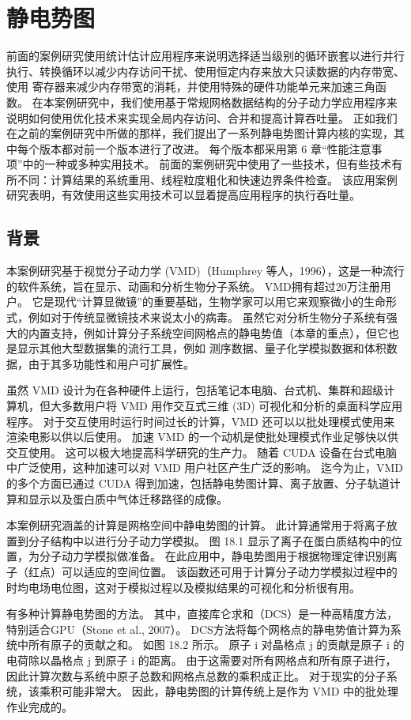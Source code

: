 \section{静电势图}
前面的案例研究使用统计估计应用程序来说明选择适当级别的循环嵌套以进行并行执行、转换循环以减少内存访问干扰、使用恒定内存来放大只读数据的内存带宽、使用 寄存器来减少内存带宽的消耗，并使用特殊的硬件功能单元来加速三角函数。 在本案例研究中，我们使用基于常规网格数据结构的分子动力学应用程序来说明如何使用优化技术来实现全局内存访问、合并和提高计算吞吐量。 正如我们在之前的案例研究中所做的那样，我们提出了一系列静电势图计算内核的实现，其中每个版本都对前一个版本进行了改进。 每个版本都采用第 6 章“性能注意事项”中的一种或多种实用技术。 前面的案例研究中使用了一些技术，但有些技术有所不同：计算结果的系统重用、线程粒度粗化和快速边界条件检查。 该应用案例研究表明，有效使用这些实用技术可以显着提高应用程序的执行吞吐量。

\subsection{背景}
本案例研究基于视觉分子动力学 (VMD)（Humphrey 等人，1996），这是一种流行的软件系统，旨在显示、动画和分析生物分子系统。 VMD拥有超过20万注册用户。 它是现代“计算显微镜”的重要基础，生物学家可以用它来观察微小的生命形式，例如对于传统显微镜技术来说太小的病毒。 虽然它对分析生物分子系统有强大的内置支持，例如计算分子系统空间网格点的静电势值（本章的重点），但它也是显示其他大型数据集的流行工具，例如 测序数据、量子化学模拟数据和体积数据，由于其多功能性和用户可扩展性。

虽然 VMD 设计为在各种硬件上运行，包括笔记本电脑、台式机、集群和超级计算机，但大多数用户将 VMD 用作交互式三维 (3D) 可视化和分析的桌面科学应用程序。 对于交互使用时运行时间过长的计算，VMD 还可以以批处理模式使用来渲染电影以供以后使用。 加速 VMD 的一个动机是使批处理模式作业足够快以供交互使用。 这可以极大地提高科学研究的生产力。 随着 CUDA 设备在台式电脑中广泛使用，这种加速可以对 VMD 用户社区产生广泛的影响。 迄今为止，VMD 的多个方面已通过 CUDA 得到加速，包括静电势图计算、离子放置、分子轨道计算和显示以及蛋白质中气体迁移路径的成像。

本案例研究涵盖的计算是网格空间中静电势图的计算。 此计算通常用于将离子放置到分子结构中以进行分子动力学模拟。 图 18.1 显示了离子在蛋白质结构中的位置，为分子动力学模拟做准备。 在此应用中，静电势图用于根据物理定律识别离子（红点）可以适应的空间位置。 该函数还可用于计算分子动力学模拟过程中的时均电场电位图，这对于模拟过程以及模拟结果的可视化和分析很有用。

有多种计算静电势图的方法。 其中，直接库仑求和（DCS）是一种高精度方法，特别适合GPU（Stone et al., 2007）。 DCS方法将每个网格点的静电势值计算为系统中所有原子的贡献之和。 如图 18.2 所示。 原子 i 对晶格点 j 的贡献是原子 i 的电荷除以晶格点 j 到原子 i 的距离。 由于这需要对所有网格点和所有原子进行，因此计算次数与系统中原子总数和网格点总数的乘积成正比。 对于现实的分子系统，该乘积可能非常大。 因此，静电势图的计算传统上是作为 VMD 中的批处理作业完成的。

